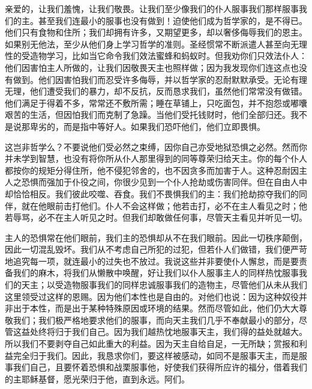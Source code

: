 亲爱的，让我们羞愧，让我们敬畏。让我们至少像我们的仆人服事我们那样服事我们的主。甚至我们连最小的服事也没有做到！迫使他们成为哲学家的，是不得已。他们只有食物和住所；我们却拥有许多，又期望更多，却以奢侈侮辱我们的恩主。如果别无他法，至少从他们身上学习哲学的准则。圣经惯常不断派遣人甚至向无理性的受造物学习，比如当它命令我们效法蜜蜂和蚂蚁时。但我劝你们只效法仆人：他们因害怕主人所做的，让我们因敬畏天主也照样做；因为我发现你们连这点也没有做到。他们因害怕我们而忍受许多侮辱，并以哲学家的忍耐默默承受。无论有理无理，他们遭受我们的暴力，却不反抗，反而恳求我们，虽然他们常常没有做错。他们满足于得着不多，常常还不敷所需；睡在草铺上，只吃面包，并不抱怨或嘟囔艰苦的生活，但因怕我们而克制了急躁。当他们受托钱财时，他们全部归还。我不是说那卑劣的，而是指中等好人。如果我们恐吓他们，他们立即畏惧。\par

这岂非哲学么？不要说他们受必然之束缚，因你自己亦受地狱恐惧之必然。然而你并未学到智慧，也没有将你所从仆人那里得到的同等尊荣归给天主。你的每个仆人都按你的规矩分得住所，他不侵犯邻舍的，也不因贪多而加害于人。这种忍耐因主人之恐惧而强加于仆役之间，你很少见到一个仆人抢劫或伤害同伴。但在自由人中却恰恰相反。我们彼此咬噬、吞食。我们不畏惧我们的主：我们抢劫掠夺我们的同伴，就在他眼前击打他们。仆人不会这样做；他若击打，必不在主人看见之时；他若辱骂，必不在主人听见之时。但我们却敢做任何事，尽管天主看见并听见一切。\par

主人的恐惧常在他们眼前，我们主的恐惧却从不在我们眼前。因此一切秩序颠倒，因此一切混乱毁坏。我们从不考虑自己所犯的过犯，但若仆人们做错，我们便严苛地追究每一项，就连最小的过失也不放过。我说这些并非要使仆人懈怠，而是要责备我们的麻木，将我们从懒散中唤醒，好让我们以仆人服事主人的同样热忱服事我们的天主；以受造物服事我们的同样忠诚服事我们的造物主，尽管他们从未从我们这里领受过这样的恩赐。因为他们本性也是自由的。对他们也说：因为这种奴役并非出于本性，而是出于某种特殊原因或环境的结果。然而尽管如此，他们仍大大尊敬我们；我们极严格地要求他们的服事，而向天主我们几乎不奉献最小的部分，尽管这益处终将归于我们自己。因为我们越热忱地服事天主，我们得的益处就越大。所以我们不要剥夺自己如此重大的利益。因为天主自给自足，一无所缺；赏报和利益完全归于我们。因此，我恳求你们，要这样被感动，如同不是服事天主，而是服事我们自己，且要怀着恐惧和战栗服事他，好使我们获得所应许的福分，借着我们的主耶稣基督，愿光荣归于他，直到永远。阿们。\par


